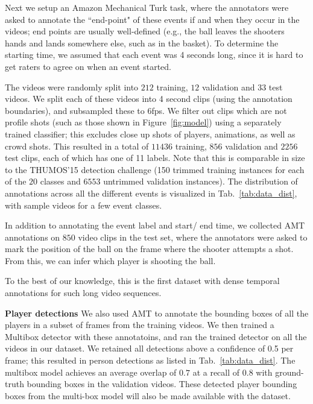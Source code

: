 Next we setup an Amazon Mechanical Turk task, where the
annotators were asked to annotate the ``end-point" of these events if and when
they occur in the videos; end points are usually well-defined (e.g.,
the ball leaves the shooters hands and lands somewhere else, such as
in the basket).
To determine the starting time, we assumed that each event was 4
seconds long, since it is hard to get raters to agree on when an event
started. 

The videos were randomly split into $212$ training, $12$ validation and $33$
test videos. 
We split each of these videos into 4 second clips (using the
annotation boundaries), and subsampled these to 6fps.
We filter out clips which are not profile shots (such as those shown in
Figure~\ref{fig:model}) using a separately trained classifier; this excludes close up shots of players, animations, as
well as crowd shots.
This resulted in a total of $11436$ training, $856$ validation
and $2256$ test clips, each of which has one of 11 labels.
Note that this is comparable in size to the THUMOS'15 detection
challenge (150 trimmed training instances for each of the $20$ classes and $6553$
untrimmed validation instances). The distribution of annotations across all the
different events is visualized in Tab.~\ref{tab:data_dist}, with sample videos
for a few event classes. 

In addition to annotating the event label and start/ end time,
we collected AMT annotations on $850$ video clips in the test
set, where the annotators were asked to mark the position of the ball
on the frame where the shooter attempts a shot.
From this, we can infer which player is shooting the ball.

To the best of our
knowledge, this is the first dataset with dense temporal annotations for
such long video sequences.

\noindent \textbf{Player detections}
We also used AMT to annotate the bounding boxes of all the players in a
subset  of frames from the training videos.
We then trained a Multibox detector \cite{Szegedy_arxiv14}
with these annotatoins, and ran the trained detector on all the videos in our dataset.
We retained all detections above a confidence of 0.5 per frame;
this resulted in person detections as listed in Tab.~\ref{tab:data_dist}.
The multibox model achieves an average overlap of $0.7$ at a recall of $0.8$
with ground-truth bounding boxes in the validation videos.
These detected player bounding boxes from the
multi-box model will also be made available with the dataset.
